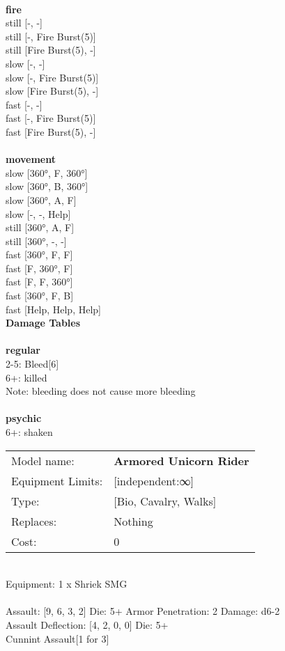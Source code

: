 \ \\ {\bf fire } \\
still [-, -] \\
still [-, Fire Burst(5)] \\
still [Fire Burst(5), -] \\
slow [-, -] \\
slow [-, Fire Burst(5)] \\
slow [Fire Burst(5), -] \\
fast [-, -] \\
fast [-, Fire Burst(5)] \\
fast [Fire Burst(5), -] \\
\ \\ {\bf movement } \\
slow [360°, F, 360°] \\
slow [360°, B, 360°] \\
slow [360°, A, F] \\
slow [-, -, Help] \\
still [360°, A, F] \\
still [360°, -, -] \\
fast [360°, F, F] \\
fast [F, 360°, F] \\
fast [F, F, 360°] \\
fast [360°, F, B] \\
fast [Help, Help, Help] \\


{\bf Damage Tables} \\
\ \\ {\bf regular } \\
2-5: Bleed[6] \\
6+: killed \\
Note: bleeding does not cause more bleeding \\
\ \\ {\bf psychic } \\
6+: shaken \\


\noindent
\begin{tabular}{ll}
Model name: &{\bf Armored Unicorn Rider } \\
Equipment Limits: &[independent:∞] \\
Type: &[Bio, Cavalry, Walks] \\
Replaces: &Nothing \\
Cost: & 0\\
\end{tabular}
\ \\
Equipment: 1 x Shriek SMG \\
\ \\
Assault: [9, 6, 3, 2] Die: 5+ Armor Penetration: 2 Damage: d6-2 \\
Assault Deflection: [4, 2, 0, 0] Die: 5+\\
\indent Cunnint Assault[1 for 3]\\ 
 
